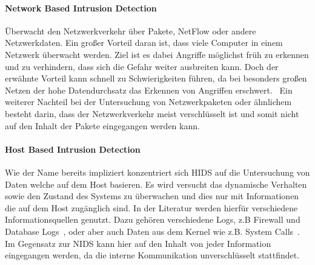             \paragraph{Network Based Intrusion Detection}
                Überwacht den Netzwerkverkehr über Pakete, NetFlow oder andere Netzwerkdaten.
                Ein großer Vorteil daran ist, dass viele Computer in einem Netzwerk überwacht werden.
                Ziel ist es dabei Angriffe möglichst früh zu erkennen und zu verhindern,
                dass sich die Gefahr weiter ausbreiten kann.
                Doch der erwähnte Vorteil kann schnell zu Schwierigkeiten führen,
                da bei besonders großen Netzen der hohe Datendurchsatz das Erkennen von Angriffen erschwert.~\cite{NIDS}
                Ein weiterer Nachteil bei der Untersuchung von Netzwerkpaketen oder ähnlichem besteht darin,
                dass der Netzwerkverkehr meist verschlüsselt ist
                und somit nicht auf den Inhalt der Pakete eingegangen werden kann.

            \paragraph{Host Based Intrusion Detection}
            Wie der Name bereits impliziert konzentriert sich \ac{HIDS} auf die Untersuchung 
                von Daten welche auf dem Host basieren.
                Es wird versucht das dynamische Verhalten sowie den Zustand des Systems zu überwachen 
                und dies nur mit Informationen die auf dem Host zugänglich sind.
                In der Literatur werden hierfür verschiedene Informationsquellen genutzt.
                Dazu gehören verschiedene Logs, z.B Firewall und Database Logs~\cite{IDSsurvey},
                oder aber auch Daten aus dem Kernel wie z.B. System Calls~\cite{MAGGI}.
                Im Gegensatz zur \ac{NIDS} kann hier auf den Inhalt von jeder Information eingegangen werden,
                da die interne Kommunikation unverschlüsselt stattfindet. 

